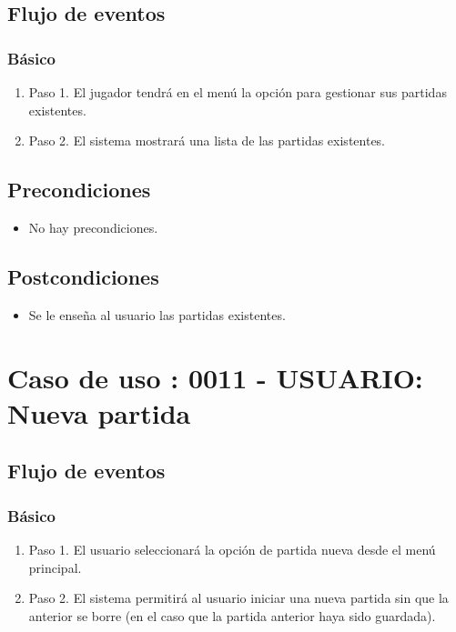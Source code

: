 \subsection{Flujo de eventos}
\subsubsection{Básico}

\begin{enumerate}
\item Paso 1.
El jugador tendrá en el menú la opción para gestionar sus partidas existentes.
\item Paso 2.
El sistema mostrará una lista de las partidas existentes.
\end{enumerate}

\subsection{Precondiciones}
\begin{itemize}
\item No hay precondiciones.
\end{itemize}

\subsection{Postcondiciones}
\begin{itemize}
\item Se le enseña al usuario las partidas existentes. 
\end{itemize}



\section{Caso de uso : 0011 - USUARIO: Nueva partida}\label{sec:uc0}
\subsection{Flujo de eventos}
\subsubsection{Básico}

\begin{enumerate}
\item Paso 1.
El usuario seleccionará la opción de partida nueva desde el menú principal. 
\item Paso 2.
El sistema permitirá al usuario iniciar una nueva partida sin que la anterior se borre (en el caso que la partida anterior haya sido guardada). 
\end{enumerate}


